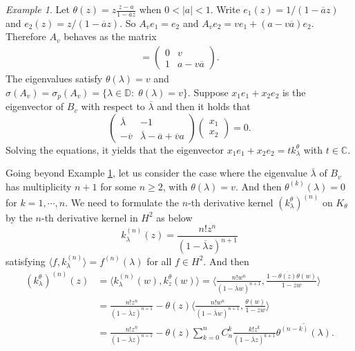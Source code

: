 \documentclass[12pt,reqno]{amsart}
\theoremstyle{definition}
\theoremstyle{remark}
\newtheorem{exm}[thm]{Example}
\numberwithin{equation}{section}
\newcommand{\la}{\langle}
\newcommand{\ra}{\rangle}
\newcommand{\ol}{\overline}
\begin{document}
\begin{exm}\label{degree2}  Let $\theta(z)=z\frac{z-a}{1-\ol{a}z}$ when $0<|a|<1.$ Write $e_1(z)=1/(1-\ol{a}z)$ and $e_2(z)=z/(1-\ol{a}z).$ So $A_v e_1=e_2$ and  $A_ve_2=ve_1+(a-v\ol{a})e_2.$
Therefore $A_v$ behaves as the matrix
\begin{align*}[A_v]=\left(\begin{array}{cc}0 & v\\
1 & a-v\ol{a}    \end{array}\right).\end{align*}
The eigenvalues satisfy  $\theta(\lambda)=v$ and $\sigma(A_v)=\sigma_p(A_v)=\{\lambda\in \mathbb{D}:\;\theta(\lambda)=v\}.$  Suppose  $x_1e_1+x_2e_2$ is the eigenvector of $B_v$ with respect to $\ol{\lambda}$ and then it holds that
\[
\left( \begin{array}{cc}
\overline{\lambda} & -1 \\
-\overline{v} & \overline{\lambda} - \overline{a} + \overline{v} a
\end{array} \right) \left( \begin{array}{c}
x_1 \\
x_2
\end{array} \right) = 0.
\]
Solving the equations, it yields that the eigenvector   \(x_1e_1+x_2 e_2= tk_{\lambda}^{\theta} \) with $t\in \mathbb{C}$.
\end{exm}
Going beyond  Example \ref{degree2},  let us consider the case where the eigenvalue $\ol{\lambda}$ of $B_v$ has multiplicity $n+1$ for some $n\geq 2$, with $\theta(\lambda)=v$. And then $\theta^{(k)}(\lambda)=0$ for $k=1, \cdots, n.$ We need to formulate the $n$-th derivative kernel $(k_{\lambda}^\theta)^{(n)}$ on $K_\theta$ by the $n$-th derivative kernel in $H^2$ as below
$$k_{\lambda}^{(n)}(z)=\frac{n!z^n}{(1-\ol{\lambda}z)^{n+1}}$$ satisfying $\la f, k_{\lambda}^{(n)}\ra=f^{(n)}(\lambda)$ for all $f\in H^2.$ And then \begin{align*}(k_{\lambda}^\theta)^{(n)}(z)&=\la k_{\lambda}^{(n)}(w),k_{z}^\theta(w)\ra=\la  \frac{n!w^n}{(1-\ol{\lambda}w)^{n+1}}, \frac{1-\ol{\theta(z)}\theta(w)}{1-\ol{z}w}\ra\\&=
\frac{n!z^n}{(1-\ol{\lambda}z)^{n+1}}-\theta(z)\la \frac{n!w^n}{(1-\ol{\lambda}w)^{n+1}}, \frac{\theta(w)}{1-\ol{z}w}\ra\\&=
\frac{n!z^n}{(1-\ol{\lambda}z)^{n+1}}-\theta(z)\sum_{k=0}^nC_n^k
\frac{k!z^{k}}{(1-\ol{\lambda}z)^{k+1}}\ol{\theta^{(n-k)}
(\lambda)}. \end{align*}
\end{document}
